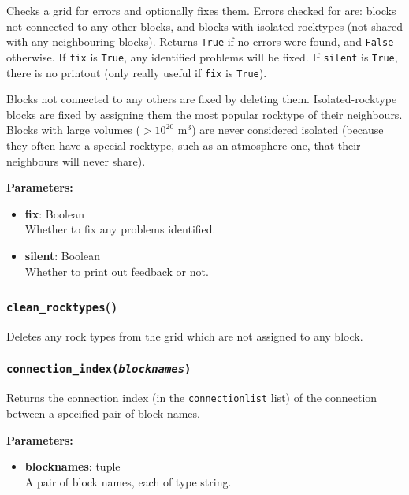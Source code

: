 Checks a grid for errors and optionally fixes them.  Errors checked for are: blocks not connected to any other blocks, and blocks with isolated rocktypes (not shared with any neighbouring blocks).  Returns \texttt{True} if no errors were found, and \texttt{False} otherwise.  If \texttt{fix} is \texttt{True}, any identified problems will be fixed.  If \texttt{silent} is \texttt{True}, there is no printout (only really useful if \texttt{fix} is \texttt{True}).

Blocks not connected to any others are fixed by deleting them.  Isolated-rocktype blocks are fixed by assigning them the most popular rocktype of their neighbours.  Blocks with large volumes ($> 10^{20}$ m$^3$) are never considered isolated (because they often have a special rocktype, such as an atmosphere one, that their neighbours will never share).

\textbf{Parameters:}
\begin{itemize}
\item \textbf{fix}: Boolean\\
  Whether to fix any problems identified.
\item \textbf{silent}: Boolean\\
  Whether to print out feedback or not.
\end{itemize}

\begin{snugshade}
\subsubsection{\texttt{clean\_rocktypes}()}
\end{snugshade}
\label{sec:t2grid:clean_rocktypes}

Deletes any rock types from the grid which are not assigned to any block.

\begin{snugshade}
\subsubsection{\texttt{connection\_index(\emph{blocknames})}}
\end{snugshade}
\label{sec:t2grid:connection_index}

Returns the connection index (in the \texttt{connectionlist} list) of the connection between a specified pair of block names.

\textbf{Parameters:}
\begin{itemize}
\item \textbf{blocknames}: tuple\\
  A pair of block names, each of type string.
\end{itemize}

